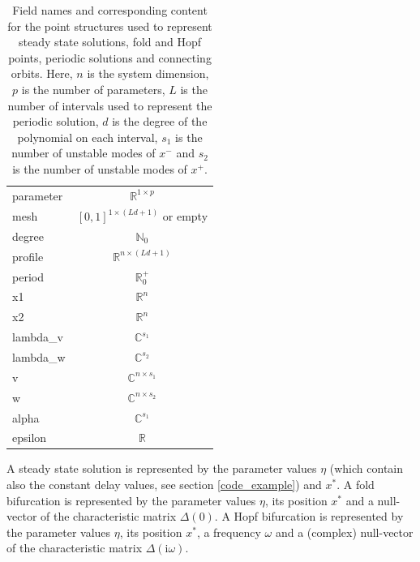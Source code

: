 \documentclass[10pt]{article}
\gdef \i{{\mathrm i}}
\gdef \RR{{\mathbb R}}
\gdef \NN{{\mathbb N}}
\gdef \CC{{\mathbb C}}
\begin{document}
{\begin{table}[h]
\begin{center}
\begin{tabular}[t]{l|c}
parameter & $\RR^{1\times p}$ \\
mesh      & $[0,1]^{1\times (Ld+1)}$ or empty \\
degree    & $\NN_0$           \\
profile   & $\RR^{n\times (Ld+1)}$ \\
period    & $\RR^+_0$         \\
x1        & $\RR^{n}$ \\
x2        & $\RR^{n}$ \\
lambda\_v  & $\CC^{s_1}$\\
lambda\_w  & $\CC^{s_2}$\\
v         & $\CC^{n\times s_1}$\\
w         & $\CC^{n\times s_2}$\\
alpha     & $\CC^{s_1}$\\
epsilon   & $\RR$\\
\end{tabular}
\end{center}
\caption{\small\label{point_structures}
Field names and corresponding content for the 
point structures used to represent steady state solutions, fold and Hopf 
points, periodic solutions and connecting orbits. Here, $n$ is 
the system dimension, $p$ is the
number of parameters, $L$ is the number of intervals used to represent
the periodic solution, $d$ is the degree of the polynomial on each
interval, $s_1$ is the number of unstable modes of $x^-$ and $s_2$ is the
number of unstable modes of $x^+$.}
\end{table}

A steady state solution is represented by the parameter values
$\eta$ (which contain also the constant delay values, 
see section \ref{code_example})
and $x^*$. A fold bifurcation is represented by the parameter
values $\eta$, its position $x^*$ and a null-vector of the
characteristic matrix $\Delta(0)$. A Hopf bifurcation is represented 
by the parameter
values $\eta$, its position $x^*$, a frequency $\omega$
and a (complex) null-vector of the
characteristic matrix $\Delta(\i \omega)$.

}
\end{document}
